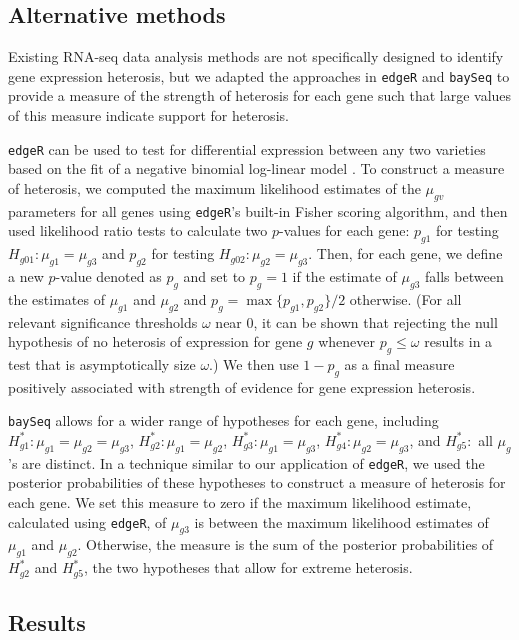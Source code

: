 \documentclass[useAMS,usenatbib,referee]{biom}
\newcommand{\edgeR}{{\tt edgeR}}
\newcommand{\RNAseq}{RNA-seq}
\begin{document}
\subsection{Alternative methods}
\label{s:alternative}

Existing \RNAseq{} data analysis methods are not specifically designed to identify gene expression heterosis, but we adapted the approaches in \edgeR{} and {\tt baySeq} to provide a measure of the strength of heterosis for each gene such that large values of this measure indicate support for heterosis.

\edgeR{} can be used to test for differential expression between any two varieties based on the fit of a negative binomial log-linear model \citep{robinson2007moderated, robinson2010edgeR}. To construct a measure of heterosis, we computed the maximum likelihood estimates of the $\mu_{gv}$ parameters for all genes using \edgeR{}'s built-in Fisher scoring algorithm, and then used likelihood ratio tests to calculate two $p$-values for each gene: $p_{g1}$  for testing $H_{g01}:\mu_{g1}=\mu_{g3}$ and $p_{g2}$ for testing $H_{g02}:\mu_{g2}=\mu_{g3}$. Then, for each gene, we define a new $p$-value denoted as $p_g$ and set to $p_g=1$ if the estimate of $\mu_{g3}$ falls between the estimates of $\mu_{g1}$ and $\mu_{g2}$ and $p_g=\max\{p_{g1},p_{g2}\}/2$ otherwise.  (For all relevant significance thresholds $\omega$ near 0, it can be shown that rejecting the null hypothesis of no heterosis of expression for gene $g$ whenever $p_g\leq \omega$ results in a test that is asymptotically size $\omega$.)  We then use $1-p_g$ as a final measure positively associated with strength of evidence for gene expression heterosis. 

{\tt baySeq} allows for a wider range of hypotheses for each gene, including $H^*_{g1}: \mu_{g1}=\mu_{g2}=\mu_{g3}$, $H^*_{g 2}: \mu_{g1}=\mu_{g2}$, $H^*_{g 3}: \mu_{g1}=\mu_{g3}$, $H^*_{g 4}: \mu_{g2}=\mu_{g3}$, and $H^*_{g 5}:$ all $\mu_g$'s are distinct. In a technique similar to our application of \edgeR{}, we used the posterior probabilities of these hypotheses to construct a measure of heterosis for each gene. We set this measure to zero if the maximum likelihood estimate, calculated using \edgeR{}, of $\mu_{g3}$ is between the maximum likelihood estimates of $\mu_{g1}$ and $\mu_{g2}$. Otherwise, the measure is the sum of the posterior probabilities of $H^*_{g 2}$ and $H^*_{g 5}$, the two hypotheses that allow for extreme heterosis.



\subsection{Results}
\end{document}
